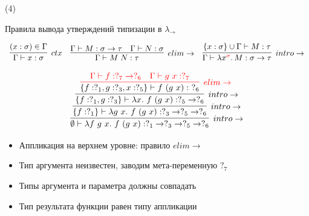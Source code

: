     \begin{frame}[t, noframenumbering]{\btypename (4)}
        \begin{block}{Правила вывода утверждений типизации в $\lambda_{\rightarrow}$}
            \vspace{-1em}
            \begin{center}
                \[
                    \begin{array}{l c r}
                        \infer[ctx]{\Gamma \vdash x: \sigma}{(x: \sigma) \in \Gamma}
                        &
                        \infer[elim\to]{\Gamma \vdash M\;N : \tau}{\Gamma \vdash M : \sigma \to \tau & \Gamma \vdash N : \sigma}
                        &
                        \infer[intro\to]{\Gamma \vdash \lambda x^{\color{red} \sigma}\ldotp M : \sigma \to \tau}{\{x : \sigma\} \cup \Gamma \vdash M : \tau}
                    \end{array}
                \]
            \end{center}
        \end{block}
        \[
            \infer[intro\to]{\emptyset \vdash \lambda f~g~x.~f~(g~x) : ?_1 \to ?_3 \to ?_5 \to ?_6}{
                \infer[intro\to]{\{f: ?_1\} \vdash \lambda g~x.~f~(g~x) : ?_3 \to ?_5 \to ?_6}{
                    \infer[intro\to]{\{f: ?_1, g: ?_3\} \vdash \lambda x.~f~(g~x) : ?_5 \to ?_6 }{
                        \color{red}\infer[elim\to]{\color{black}\{f: ?_1, g: ?_3, x: ?_5\} \vdash f~(g~x) :~ ?_6}{
                            \Gamma \vdash f : ?_7 \to ?_6 &
                            \Gamma \vdash g~x : ?_7
                        }}}}
        \]
        \vspace{-1em}
        \begin{itemize}
            \item Аппликация на верхнем уровне: правило $elim\to$
            \item Тип аргумента неизвестен, заводим мета-переменную $?_7$
            \item Типы аргумента и параметра должны совпадать
            \item Тип результата функции равен типу аппликации
        \end{itemize}
    \end{frame}

